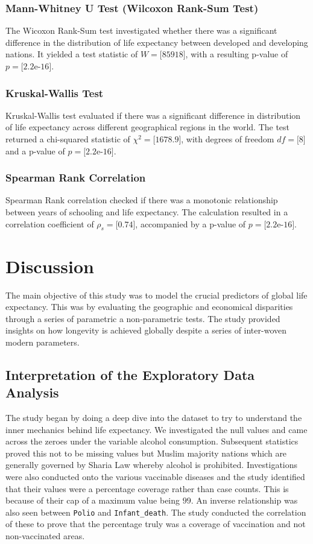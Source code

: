 \documentclass[3pt, a4paper]{article}
\begin{document}
\subsubsection{Mann-Whitney U Test (Wilcoxon Rank-Sum Test)}
The Wicoxon Rank-Sum test investigated whether there was a significant difference in the distribution of life expectancy between developed and developing nations. It yielded a test statistic of $W = \text{[85918]}$, with a resulting p-value of $p = \text{[2.2e-16]}$.
\subsubsection{Kruskal-Wallis Test}
Kruskal-Wallis test evaluated if there was a significant difference in distribution of life expectancy across different geographical regions in the world. The test returned a chi-squared statistic of $\chi^2 = \text{[1678.9]}$, with degrees of freedom $df = \text{[8]}$ and a p-value of $p = \text{[2.2e-16]}$.
\subsubsection{Spearman Rank Correlation}
Spearman Rank correlation checked if there was a monotonic relationship between years of schooling and life expectancy. The calculation resulted in a correlation coefficient of $\rho_s = \text{[0.74]}$, accompanied by a p-value of $p = \text{[2.2e-16]}$.

\section{Discussion}
The main objective of this study was to model the crucial predictors of global life expectancy. This was by evaluating the geographic and economical disparities through a series of parametric a non-parametric tests. The study provided insights on how longevity is achieved globally despite a series of inter-woven modern parameters.

\subsection{Interpretation of the Exploratory Data Analysis}
The study began by doing a deep dive into the dataset to try to understand the inner mechanics behind life expectancy. We investigated the null values and came across the zeroes under the variable alcohol consumption. Subsequent statistics proved this not to be missing values but Muslim majority nations which are generally governed by Sharia Law whereby alcohol is prohibited. Investigations were also conducted onto the various vaccinable diseases and the study identified that their values were a percentage coverage rather than case counts. This is because of their cap of a maximum value being $99$. An inverse relationship was also seen between \texttt{Polio} and \texttt{Infant\_death}. The study conducted the correlation of these to prove that the percentage truly was a coverage of vaccination and not non-vaccinated areas. 
\end{document}
